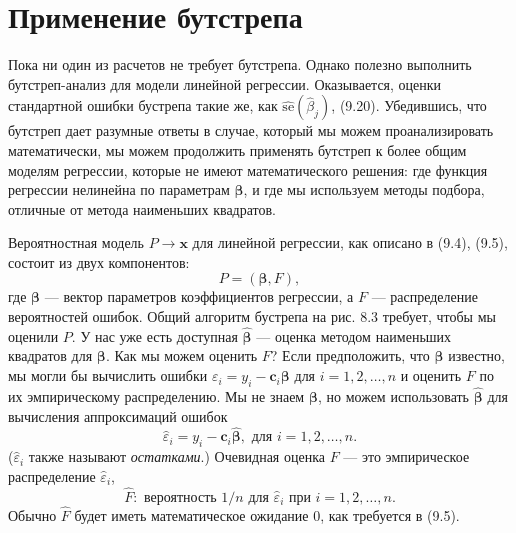 \section{Применение бутстрепа}

Пока ни один из расчетов не требует бутстрепа. Однако полезно выполнить бутстреп-анализ для модели линейной регрессии. Оказывается, оценки стандартной ошибки бустрепа такие же, как $\widehat{\text{se}}(\hat{\beta}_j)$, (9.20). Убедившись, что бутстреп дает разумные ответы в случае, который мы можем проанализировать математически, мы можем продолжить применять бутстреп к более общим моделям регрессии, которые не имеют математического решения: где функция регрессии нелинейна по параметрам $\bm{\beta}$, и где мы используем методы подбора, отличные от метода наименьших квадратов.

Вероятностная модель $P \to \textbf{x}$ для линейной регрессии, как описано в (9.4), (9.5), состоит из двух компонентов:
\begin{equation}
	P = (\bm{\beta}, F),
\end{equation}
где $\bm{\beta}$ --- вектор параметров коэффициентов регрессии, а $F$ --- распределение вероятностей ошибок. Общий алгоритм бустрепа на рис. 8.3 требует, чтобы мы оценили $P$. У нас уже есть доступная $\hat{\bm{\beta}}$ --- оценка методом наименьших квадратов для $\bm{\beta}$. Как мы можем оценить $F$? Если предположить, что $\bm{\beta}$ известно, мы могли бы вычислить ошибки $\varepsilon_i = y_i - \textbf{c}_i \bm{\beta}$ для $i = 1,2, \ldots, n$ и оценить $F$ по их эмпирическому распределению. Мы не знаем $\bm{\beta}$, но можем использовать $\hat{\bm{\beta}}$ для вычисления аппроксимаций ошибок
\begin{equation}
	\hat{\varepsilon}_i = y_i - \textbf{c}_i \hat{\bm{\beta}}, \text{  для  } i = 1,2, \ldots, n.
\end{equation}
($\hat{\varepsilon}_i$ также называют \textit{остатками}.) Очевидная оценка $F$ --- это эмпирическое распределение $\hat{\varepsilon}_i$,
\begin{equation}
	\hat{F}: \text{ вероятность } 1/n \text{ для } \hat{\varepsilon}_i \text{ при } i = 1,2, \ldots, n.
\end{equation}
Обычно $\hat{F}$ будет иметь математическое ожидание $0$, как требуется в (9.5).

